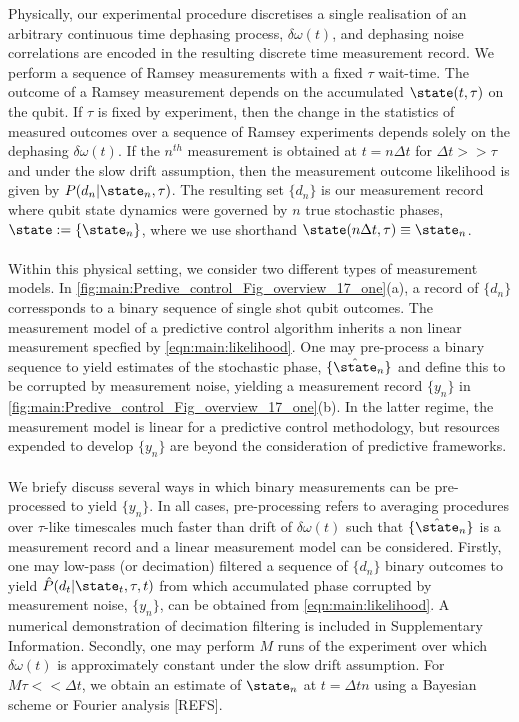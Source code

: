 Physically, our experimental procedure discretises a single realisation of an arbitrary continuous time dephasing process, $\delta \omega(t)$, and dephasing noise correlations are encoded in the resulting discrete time measurement record. We perform a sequence of Ramsey measurements with a fixed $\tau$ wait-time. The outcome of a Ramsey measurement depends on the accumulated $\state(t,\tau)$ on the qubit. If $\tau$ is fixed by experiment, then the change in the statistics of measured outcomes over a sequence of Ramsey experiments depends solely on the dephasing  $\delta \omega(t)$.   If the $n^{th}$ measurement is obtained at $t = n \Delta t$ for $\Delta t >> \tau$ and under the slow drift assumption, then the measurement outcome likelihood is given by $P(d_n | \state_n, \tau)$. The resulting set $\{d_n\}$ is our measurement record where qubit state dynamics were governed by $n$ true stochastic phases, $\state := \{\state_n\}$, where we use shorthand $\state(n \Delta t ,\tau) \equiv \state_n$. 
\\
\\
Within this physical setting, we consider two different types of measurement models. In \cref{fig:main:Predive_control_Fig_overview_17_one}(a), a record of $\{ d_n\}$  corressponds to a binary sequence of single shot qubit outcomes. The measurement model of a predictive control algorithm inherits a non linear measurement specfied by \cref{eqn:main:likelihood}. One may pre-process a binary sequence to yield estimates of the stochastic phase, $\{ \hat{\state}_n\}$ and define this to be corrupted by measurement noise, yielding a measurement record $\{ y_n\}$ in  \cref{fig:main:Predive_control_Fig_overview_17_one}(b). In the latter regime, the measurement model is linear for a predictive control methodology, but resources expended to develop $\{ y_n\}$ are beyond the consideration of predictive frameworks.
\\
\\
We briefy discuss several ways in which binary measurements can be pre-processed to yield $\{ y_n\}$. In all cases, pre-processing refers to averaging procedures over $\tau$-like timescales much faster than drift of $\delta \omega (t)$ such that $\{ \hat{\state}_n\}$ is a measurement record and a linear measurement model can be considered. Firstly, one may low-pass (or decimation) filtered a sequence of $\{ d_n\}$ binary outcomes to yield $\hat{P}(d_t | \state_t, \tau, t)$ from which accumulated phase corrupted by measurement noise, $\{ y_n\}$, can be obtained from \cref{eqn:main:likelihood}. A numerical demonstration of decimation filtering is included in Supplementary Information. Secondly, one may perform $M$ runs of the experiment over which $\delta \omega (t)$ is approximately constant under the slow drift assumption. For $M\tau << \Delta t$, we obtain an estimate of  $\state_n$ at $t = \Delta t n$ using a Bayesian scheme or Fourier analysis [REFS]. 
